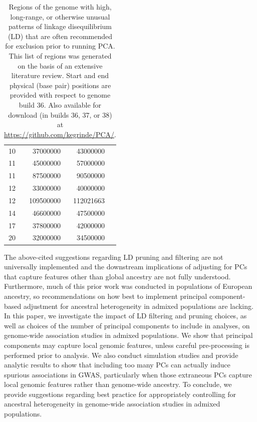 \documentclass[12pt]{article}
\begin{document}
\begin{table}
\begin{tabular}{crrl}
10  &  37000000    &    43000000   &    \citep{anderson2010, price2008, weale2010}  \\
11   & 45000000    &    57000000   &    \citep{fellay2007, price2008, weale2010} \\
11   & 87500000    &    90500000   &    \citep{anderson2010, price2008, weale2010}  \\
12   & 33000000    &    40000000   &    \citep{anderson2010, price2008, weale2010} \\
12   & 109500000   &    112021663   &    \citep{price2008, weale2010} \\
14   & 46600000    &    47500000   &    \citep{prive2018} \\
17   & 37800000    &    42000000    &   \citep{novembre2008, conomos2016} \\
20   & 32000000   &     34500000    &   \citep{anderson2010, price2008, weale2010}  \\
\end{tabular}
\caption{Regions of the genome with high, long-range, or otherwise unusual patterns of linkage disequilibrium (LD) that are often recommended for exclusion prior to running PCA. This list of regions was generated on the basis of an extensive literature review. Start and end physical (base pair) positions are provided with respect to genome build 36. Also available for download (in builds 36, 37, or 38) at \href{github.com/kegrinde/PCA}{https://github.com/kegrinde/PCA/}.}
\label{tab:highLD}
\end{table}


The above-cited suggestions regarding LD pruning and filtering are not universally implemented and the downstream implications of adjusting for PCs that capture features other than global ancestry are not fully understood.
Furthermore, much of this prior work was conducted in populations of European ancestry, so recommendations on how best to implement principal component-based adjustment for ancestral heterogeneity in admixed populations are lacking. 
In this paper, we investigate the impact of LD filtering and pruning choices, as well as choices of the number of principal components to include in analyses, on genome-wide association studies in admixed populations.
We show that principal components may capture local genomic features, unless careful pre-processing is performed prior to analysis.
We also conduct simulation studies and provide analytic results to show that including too many PCs can actually induce spurious associations in GWAS, particularly when those extraneous PCs capture local genomic features rather than genome-wide ancestry.
To conclude, we provide suggestions regarding best practice for appropriately controlling for ancestral heterogeneity in genome-wide association studies in admixed populations.
\end{document}

